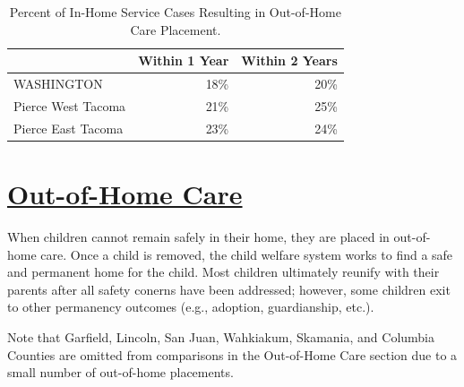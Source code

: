 \documentclass{article}\usepackage{graphicx, color}
\begin{document}
\begin{table}[ht]
\centering
\caption{Percent of In-Home Service Cases Resulting in Out-of-Home Care Placement.} 
\begin{tabular}{lrr}
  \toprule
 & Within 1 Year & Within 2 Years \\ 
  \midrule
WASHINGTON & 18\% & 20\% \\ 
  Pierce West Tacoma & 21\% & 25\% \\ 
  Pierce East Tacoma & 23\% & 24\% \\ 
   \bottomrule
\end{tabular}
\end{table}



\section{\href{http://www.partnersforourchildren.org/child-well-being/visualizations/out-home-care/trends}
    {Out-of-Home Care}
}
When children cannot remain safely in their home, they are placed in out-of-home care. Once a child is removed, the child welfare system works to find a safe and permanent home for the child. Most children ultimately reunify with their parents after all safety conerns have been addressed; however, some children exit to other permanency outcomes (e.g., adoption, guardianship, etc.).

Note that Garfield, Lincoln, San Juan, Wahkiakum, Skamania, and Columbia Counties are omitted from comparisons in the Out-of-Home Care section due to a small number of out-of-home placements.
\end{document}
